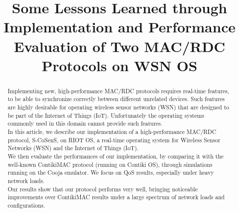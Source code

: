 \documentclass[conference]{IEEEtran}
\begin{document}


\title{Some Lessons Learned through Implementation and Performance Evaluation
       of Two MAC/RDC Protocols on WSN OS}


\author{
}






\maketitle

\begin{abstract}
Implementing new, high-performance MAC/RDC protocols requires
real-time features, to be able to synchronize correctly between different
unrelated devices. Such features are highly desirable for operating wireless
sensor networks (WSN) that are designed to be part of the Internet of Things
(IoT). Unfortunately the operating systems commonly used in this domain
cannot provide such features.\\
In this article, we describe our implementation of a high-performance MAC/RDC
protocol, S-CoSenS, on RIOT OS, a real-time operating system for Wireless
Sensor Networks (WSN) and the Internet of Things (IoT).\\
We then evaluate the performances of our implementation, by comparing it with
the well-known ContikiMAC protocol (running on Contiki OS), through
simulations running on the Cooja emulator. We focus on QoS results,
especially under heavy network loads.\\
Our results show that our protocol performs very well, bringing noticeable
improvements over ContikiMAC results under a large spectrum of network loads
and configurations.
\end{abstract}
\end{document}
